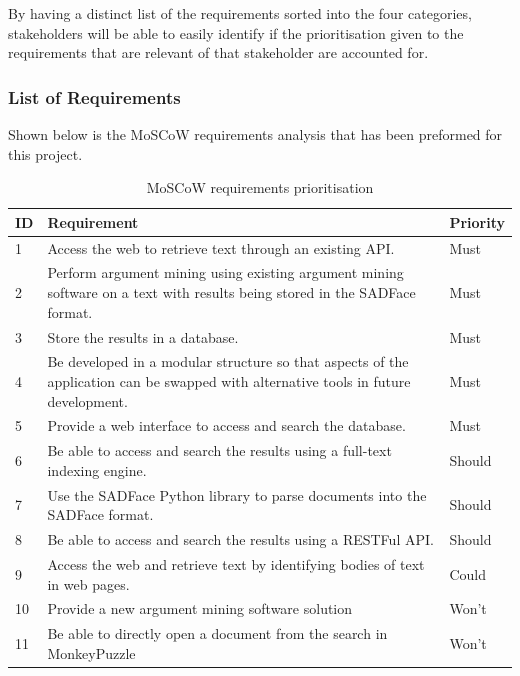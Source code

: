 \documentclass[12pt,a4paper]{article}
\begin{document}
By having a distinct list of the requirements sorted into the four categories, stakeholders will be able to easily identify if the prioritisation given to the requirements that are relevant of that stakeholder are accounted for.

\subsubsection{List of Requirements}

Shown below is the MoSCoW requirements analysis that has been preformed for this project.

\begin{table}[htbp]
    \centering
    \begin{tabular}{|p{1cm}|p{8cm}|p{2cm}|}
    \hline
    ID & Requirement & Priority\\
    \hline
    1 & Access the web to retrieve text through an existing API. & Must\\
    \hline
    2 & Perform argument mining using existing argument mining software on a text with results being stored in the SADFace format. & Must\\
    \hline
    3 & Store the results in a database. & Must\\
    \hline
    4 & Be developed in a modular structure so that aspects of the application can be swapped with alternative tools in future development. & Must\\
    \hline
    5 & Provide a web interface to access and search the database. & Must\\
    \hline
    6 & Be able to access and search the results using a full-text indexing engine. & Should\\
    \hline
    7 & Use the SADFace Python library to parse documents into the SADFace format. & Should\\
    \hline
    8 & Be able to access and search the results using a RESTFul API. & Should\\
    \hline
    9 & Access the web and retrieve text by identifying bodies of text in web pages. & Could\\
    \hline
    10 & Provide a new argument mining software solution & Won't\\
    \hline
    11 & Be able to directly open a document from the search in MonkeyPuzzle & Won't\\
    \hline
    \end{tabular}
    \caption{MoSCoW requirements prioritisation}
    \label{table:1}
\end{table}
\end{document}
